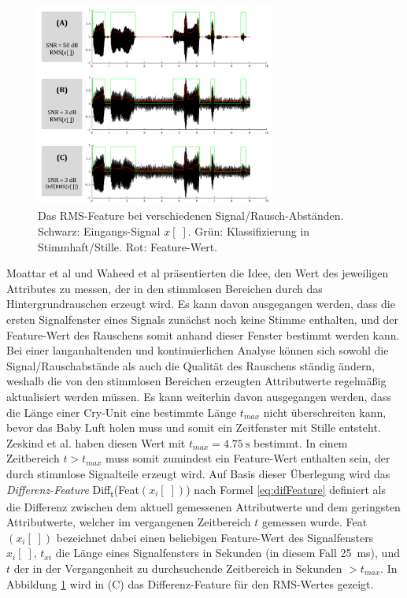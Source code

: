 \begin{figure}[h]
	\centering
	\includegraphics[width=0.7\textwidth]{bilder/rms_diff.png}
	\caption{Das RMS-Feature bei verschiedenen Signal/Rausch-Abständen. Schwarz: Eingangs-Signal $x[\;]$. Grün: Klassifizierung in Stimmhaft/Stille. Rot: Feature-Wert.}
	\label{img:min-signal}
\end{figure}

Moattar et al \cite{vad_Easy} und Waheed et al \cite{vad_entropy} präsentierten die Idee, den Wert des jeweiligen Attributes zu messen, der in den stimmlosen Bereichen durch das Hintergrundrauschen erzeugt wird. Es kann davon ausgegangen werden, dass die ersten Signalfenster eines Signals zunächst noch keine Stimme enthalten, und der Feature-Wert des Rauschens somit anhand dieser Fenster bestimmt werden kann. Bei einer langanhaltenden und kontinuierlichen Analyse können sich sowohl die Signal/Rauschabstände als auch die Qualität des Rauschens ständig ändern, weshalb die von den stimmlosen Bereichen erzeugten Attributwerte regelmäßig aktualisiert werden müssen. Es kann weiterhin davon ausgegangen werden, dass die Länge einer Cry-Unit eine bestimmte Länge $t_{max}$ nicht überschreiten kann, bevor das Baby Luft holen muss und somit ein Zeitfenster mit Stille entsteht. Zeskind et al. \cite[S. 325]{rythmic} haben diesen Wert mit $t_{max} = \SI{4.75}{\second}$ bestimmt. In einem Zeitbereich $ t > t_{max}$ muss somit zumindest ein Feature-Wert enthalten sein, der durch stimmlose Signalteile erzeugt wird. Auf Basis dieser Überlegung wird das \emph{Differenz-Feature} Diff\textsubscript{t}(Feat$(x_i[\;])$) nach Formel \ref{eq:difFeature} definiert als die Differenz zwischen dem aktuell gemessenen Attributwerte und dem geringsten Attributwerte, welcher im vergangenen Zeitbereich $t$ gemessen wurde. Feat$(x_i[\;])$ bezeichnet dabei einen beliebigen Feature-Wert des Signalfensters $x_i[\;]$, $t_{xi}$ die Länge eines Signalfensters in Sekunden (in diesem Fall \SI{25}{\milli\second}), und $t$ der in der Vergangenheit zu durchsuchende Zeitbereich in Sekunden $> t_{max}$. In Abbildung \ref{img:min-signal} wird in (C) das Differenz-Feature für den RMS-Wertes gezeigt.

